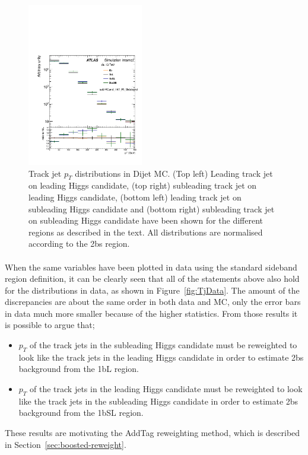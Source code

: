 \begin{figure}[htbp!]
\begin{center}
\includegraphics[angle=270, width=0.45\textwidth]{./figures/boosted/AppendixDijetMC/sublHCand_trk1_Pt_SidebandwoPr_log.pdf}
 \caption{Track jet $p_{T}$ distributions in Dijet MC. (Top left) Leading track jet on leading Higgs candidate, (top right) subleading track jet on leading Higgs candidate, (bottom left) leading track jet on subleading Higgs candidate and (bottom right) subleading track jet on subleading Higgs candidate have been shown for the different regions as described in the text. All distributions are normalised according to the 2bs region.}
\label{fig:TjMC}
\end{center}
\end{figure}

\paragraph{}
When the same variables have been plotted in data using the standard sideband region definition, it can be clearly seen that all of the statements above also hold for the distributions in data, as shown in Figure~\ref{fig:TjData}. The amount of the discrepancies are about the same order in both data and MC, only the error bars in data much more smaller because of the higher statistics. 
From those results it is possible to argue that; 
\begin{itemize}
\item$p_{T}$ of the track jets in the subleading Higgs candidate must be reweighted to look like the track jets in the leading Higgs candidate in order to estimate 2bs background from the 1bL region. 
\item$p_{T}$ of the track jets in the leading Higgs candidate must be reweighted to look like the track jets in the subleading Higgs candidate in order to estimate 2bs background from the 1bSL region. 
\end{itemize}  
These results are motivating the AddTag reweighting method, which is described in Section~\ref{sec:boosted-reweight}. 

